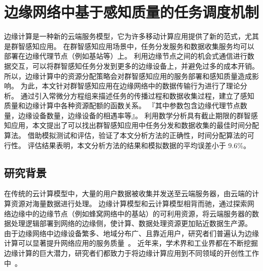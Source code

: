 
\chapter{边缘网络中基于感知质量的任务调度机制}


边缘计算是一种新的云端服务模型，它为许多移动计算应用提供了新的范式，尤其是群智感知应用。
在群智感知应用场景中，任务分发服务和数据收集服务均可以部署在边缘代理节点（例如基站等）上。
利用边缘节点之间的机会式通信进行数据交互，可以将群智感知任务分发到更多的边缘设备上，并避免过多的成本开销。
所以，边缘计算中的资源分配策略会对群智感知应用的服务部署和感知质量造成影响。
为此，本文针对群智感知应用在边缘网络中的数据传输行为进行了理论分析。
通过引入常微分方程组来描述任务的传播过程和数据收集过程，建立了感知质量和边缘计算中各种资源配额的函数关系。
『其中参数包含边缘代理节点数量，边缘设备数量，边缘设备的相遇率等』。
利用数学分析具有截止期限的群智感知应用，本文提出了可以找出群智感知应用中任务分发和数据收集的最佳时间分配算法。
借助模拟测试和评估，验证了本文分析方法的正确性，时间分配算法的可行性。
评估结果表明，本文分析方法的结果和模拟数据的平均误差小于 9.6\%。

\section{研究背景}


在传统的云计算模型中，大量的用户数据被收集并发送至云端服务器，由云端的计算资源对海量数据进行处理。
边缘计算模型和云计算模型相背而驰，通过探索网络边缘中的边缘节点（例如蜂窝网络中的基站）的可利用资源，将云端服务器的数据处理逻辑部署到网络的边缘侧，使计算、数据处理资源更加贴近数据生产源。
由于边缘网络中边缘设备繁多、地域分布广、且靠近用户，研究者们普遍认为边缘计算可以显著提升网络应用的服务质量~\cite{DBLP:conf/sigcomm/BonomiMZA12}。
近年来，学术界和工业界都在不断挖掘边缘计算的巨大潜力，研究者们都致力于将边缘计算应用到不同领域的开创性工作中~\cite{DBLP:journals/access/MarjanovicAZ18,DBLP:journals/iotj/ChiangZ16}。

